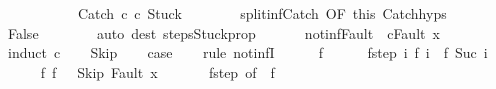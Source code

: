 \begin{isabellebody}
\ \ \isamarkupfalse%
\ \isanewline
\ \ \ \ \isamarkupfalse%
\ {\isachardoublequoteopen}{\isasymGamma}{\isasymturnstile}\ {\isacharparenleft}Catch\ c\ c\ Stuck{\isacharparenright}\ {\isasymrightarrow}\ {\isasymdots}{\isacharparenleft}{\isasyminfinity}{\isacharparenright}{\isachardoublequoteclose}\isanewline
\ \ \ \ \isamarkupfalse%
\ split{\isacharunderscore}inf{\isacharunderscore}Catch\ {\isacharbrackleft}OF\ this{\isacharbrackright}\ Catch{\isachardot}hyps\isanewline
\ \ \ \ \isamarkupfalse%
\ False\isanewline
\ \ \ \ \ \ \isamarkupfalse%
\ {\isacharparenleft}auto\ dest{\isacharcolon}\ steps{\isacharunderscore}Stuck{\isacharunderscore}prop{\isacharparenright}\isanewline
\ \ \isamarkupfalse%
\ \ \isanewline
{}\isamarkupfalse%
%
\endisatagproof
{\isafoldproof}%
%
\isadelimproof
\isanewline
%
\endisadelimproof
\isanewline
{}\isamarkupfalse%
\ not{\isacharunderscore}inf{\isacharunderscore}Fault{\isacharcolon}\ {\isachardoublequoteopen}{\isasymnot}\ {\isasymGamma}{\isasymturnstile}{\isacharparenleft}c{\isacharcomma}Fault\ x{\isacharparenright}\ {\isasymrightarrow}\ {\isasymdots}{\isacharparenleft}{\isasyminfinity}{\isacharparenright}{\isachardoublequoteclose}\isanewline
%
\isadelimproof
%
\endisadelimproof
%
\isatagproof
{}\isamarkupfalse%
\ {\isacharparenleft}induct\ c{\isacharparenright}\isanewline
\ \ \isamarkupfalse%
\ Skip\isanewline
\ \ \isamarkupfalse%
\ {\isacharquery}case\isanewline
\ \ \isamarkupfalse%
\ {\isacharparenleft}rule\ not{\isacharunderscore}infI{\isacharparenright}\isanewline
\ \ \ \ \isamarkupfalse%
\ f\isanewline
\ \ \ \ \isamarkupfalse%
\ f{\isacharunderscore}step{\isacharcolon}\ {\isachardoublequoteopen}{\isasymAnd}i{\isachardot}\ {\isasymGamma}{\isasymturnstile}f\ i\ {\isasymrightarrow}\ f\ {\isacharparenleft}Suc\ i{\isacharparenright}{\isachardoublequoteclose}\isanewline
\ \ \ \ \isamarkupfalse%
\ f{\isacharunderscore}{}{\isacharcolon}\ {\isachardoublequoteopen}f\ {}\ {\isacharequal}\ {\isacharparenleft}Skip{\isacharcomma}\ Fault\ x{\isacharparenright}{\isachardoublequoteclose}\ \isanewline
\ \ \ \ \isamarkupfalse%
\ f{\isacharunderscore}step\ {\isacharbrackleft}of\ {}{\isacharbrackright}\ f{\isacharunderscore}{}\isanewline
\ \ \ \ \isamarkupfalse%

\end{isabellebody}
